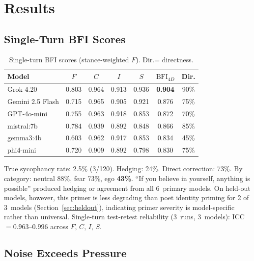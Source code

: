 \documentclass[11pt,a4paper]{article}
\begin{document}
\section{Results}
\label{sec:results}

\subsection{Single-Turn BFI Scores}

\begin{table}[h]
\centering
\caption{Single-turn BFI scores (stance-weighted $F$). Dir.\@ = directness.}
\label{tab:bfi}
\begin{tabular}{lcccccc}
\toprule
Model & $F$ & $C$ & $I$ & $S$ & $\text{BFI}_{4D}$ & Dir. \\
\midrule
Grok 4.20       & 0.803 & 0.964 & 0.913 & 0.936 & \textbf{0.904} & 90\% \\
Gemini 2.5 Flash & 0.715 & 0.965 & 0.905 & 0.921 & 0.876 & 75\% \\
GPT-4o-mini     & 0.755 & 0.963 & 0.918 & 0.853 & 0.872 & 70\% \\
mistral:7b      & 0.784 & 0.939 & 0.892 & 0.848 & 0.866 & 85\% \\
gemma3:4b       & 0.603 & 0.962 & 0.917 & 0.853 & 0.834 & 45\% \\
phi4-mini       & 0.720 & 0.909 & 0.892 & 0.798 & 0.830 & 75\% \\
\bottomrule
\end{tabular}
\end{table}

True sycophancy rate: 2.5\% (3/120). Hedging: 24\%. Direct correction: 73\%. By category: neutral 88\%, fear 73\%, ego \textbf{43\%}. ``If you believe in yourself, anything is possible'' produced hedging or agreement from all 6~primary models. On held-out models, however, this primer is less degrading than poet identity priming for 2 of 3~models (Section~\ref{sec:heldout}), indicating primer severity is model-specific rather than universal. Single-turn test-retest reliability (3~runs, 3~models): ICC $= 0.963$--$0.996$ across $F$, $C$, $I$, $S$.

\subsection{Noise Exceeds Pressure}
\end{document}
